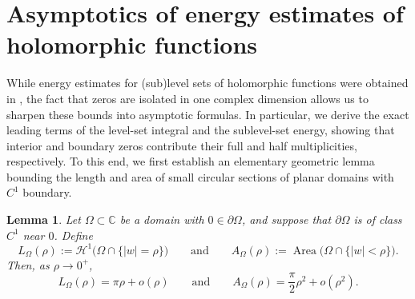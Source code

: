\documentclass[12pt,twoside]{amsart}
\numberwithin{equation}{section}
\newtheorem{lemma}[theorem]{Lemma}
\numberwithin{definition}{section} %
\begin{document}
\section{Asymptotics of energy estimates of holomorphic functions}\label{sec2}
While energy estimates for (sub)level sets of holomorphic functions were obtained in \cite{psww2026}, the fact that zeros are isolated in one complex dimension allows us to sharpen these bounds into asymptotic formulas. In particular, we derive the exact leading terms of the level-set integral and the sublevel-set energy, showing that interior and boundary zeros contribute their full and half multiplicities, respectively. To this end, we first establish an elementary geometric lemma bounding the length and area of small circular sections of planar domains with $C^1$ boundary.



\begin{lemma}\label{lem3.1}
Let $\Omega \subset \mathbb{C}$ be a domain with $0 \in \partial\Omega$, and suppose that $\partial\Omega$ is of class $C^1$ near $0$. Define
\[
L_{\Omega}(\rho) := \mathcal{H}^1\bigl(\Omega \cap \{|w|=\rho\}\bigr)
\qquad \text{and} \qquad
A_{\Omega}(\rho) := \operatorname{Area}\bigl(\Omega \cap \{|w|<\rho\}\bigr).
\]
Then, as $\rho \to 0^+$,
\begin{equation}\label{eq:half-domain-asymptotics}
L_{\Omega}(\rho) = \pi\rho + o(\rho)
\qquad \text{and} \qquad
A_{\Omega}(\rho) = \frac{\pi}{2}\rho^2 + o(\rho^2).
\end{equation}
\end{lemma}
\end{document}
